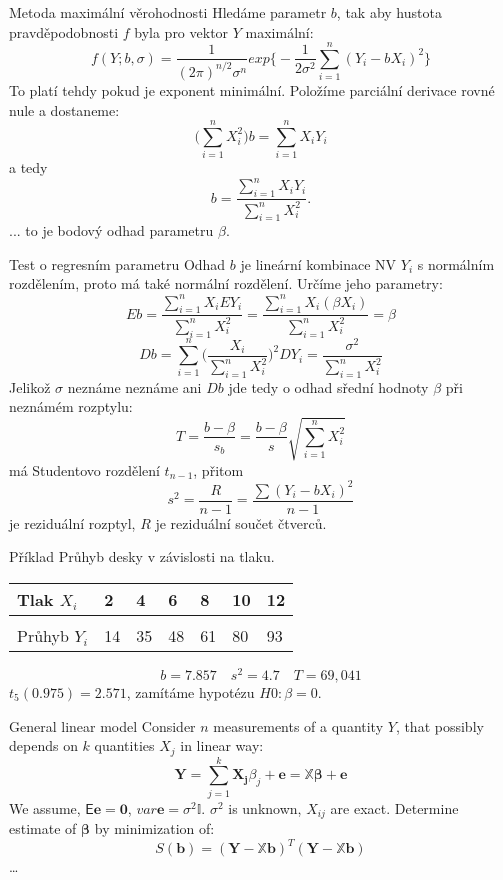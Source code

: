 \documentclass[smaller]{beamer}
\def\vc#1{\mathbf{\boldsymbol{#1}}}     %
\def\tn#1{{\mathbb{#1}}}    %
\def\E{\vc{\mathsf{E}}}
\begin{document}
\begin{frame}{Metoda maximální věrohodnosti}
 Hledáme parametr $b$, tak aby hustota pravděpodobnosti $f$ byla pro vektor $Y$ maximální:
 \[
   f(Y;b,\sigma) = \frac{1}{(2\pi)^{n/2}\sigma^n} exp\Big\{ -\frac{1}{2\sigma^2} \sum_{i=1}^{n} (Y_i - b X_i)^2 \Big\}
 \]
 To platí tehdy pokud je exponent minimální. Položíme parciální derivace rovné nule a dostaneme:
 \[
    \big(\sum_{i=1}^n X_i^2\big) b = \sum_{i=1}^n X_iY_i 
 \]
 a tedy 
\[ 
   b = \frac{\sum_{i=1}^n X_iY_i}{\sum_{i=1}^n X_i^2}.
\]
... to je bodový odhad parametru $\beta$.
\end{frame}

\begin{frame}{Test o regresním parametru}
Odhad $b$ je lineární kombinace NV $Y_i$ s normálním rozdělením, proto má také normální rozdělení. Určíme jeho parametry:
\[
 E b = \frac{\sum_{i=1}^n X_i E Y_i}{\sum_{i=1}^n X_i^2} = \frac{\sum_{i=1}^n X_i (\beta X_i)}{\sum_{i=1}^n X_i^2} =\beta
\]
\[
 D b = \sum_{i=1}^n \Big(\frac{X_i}{\sum_{i=1}^n X_i^2}\Big)^2 D Y_i = \frac{\sigma^2}{{\sum_{i=1}^n X_i^2}}
\]
Jelikož $\sigma$ neznáme neznáme ani $D b$ jde tedy o odhad sřední hodnoty $\beta$ při neznámém rozptylu:
\[
 T = \frac{b-\beta}{s_b} = \frac{b - \beta}{s} \sqrt{\sum_{i=1}^n X_i^2}
\]
má Studentovo rozdělení $t_{n-1}$, přitom
\[
 s^2 = \frac{R}{n-1} = \frac{\sum (Y_i - b X_i)^2}{n-1}
\]
je reziduální rozptyl, $R$ je reziduální součet čtverců. 
\end{frame}


\begin{frame}{Příklad}
 Průhyb desky v závislosti na tlaku.
\begin{center}
\begin{tabular}{l|llllll}
Tlak $X_i$ & 2 & 4 & 6 & 8 & 10 & 12\\
\hline\\
Průhyb $Y_i$ & 14 & 35 & 48 & 61 & 80 & 93\\
\end{tabular}
\end{center}

\[
  b = 7.857\quad s^2 = 4.7\quad T = 69,041
\]
$t_5(0.975) = 2.571$, zamítáme hypotézu $H0: \beta = 0$. 

\end{frame}

\begin{frame}{General linear model}
Consider $n$ measurements of a quantity $Y$, that possibly depends on $k$ quantities $X_j$  in linear way:
\[
   \vc{Y} = \sum_{j=1}^k \vc{X_j} \beta_j + \vc{e} = \tn X \vc{\beta} + \vc e
\]
We assume, $\E \vc e = \vc 0$, $var \vc e = \sigma^2 \tn I$. $\sigma^2$ is unknown, $X_{ij}$ are exact.
Determine estimate of $\vc \beta$ by minimization of:
\[
   S(\vc b) = (\vc Y -\tn X\vc b)^T (\vc Y - \tn X\vc b)
\]
\dots

\end{frame}
\end{document}

